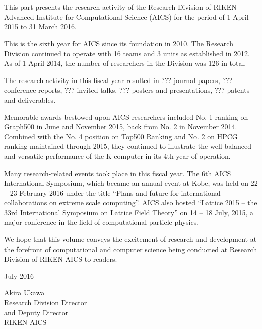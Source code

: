 \chapter*{}

This part presents the research activity of the Research Division of RIKEN Advanced Institute for Computational Science (AICS) for the period of 1 April 2015 to 31 March 2016.

This is the sixth year for AICS since its foundation in 2010.  The Research Division continued to operate with 16 teams and 3 units as established in 2012.  As of 1 April 2014, the number of researchers in the Division was 126 in total.

The research activity in this fiscal year resulted in ??? journal papers, ??? conference reports, ??? invited talks, ??? posters and presentations, ??? patents and deliverables.

Memorable awards bestowed upon AICS researchers included No. 1 ranking on Graph500 in June and November 2015, back from No. 2 in November 2014.  Combined with the No. 4 position on Top500 Ranking and No. 2 on HPCG ranking maintained through 2015, they continued to illustrate the well-balanced and versatile performance of the K computer in its 4th year of operation.

Many research-related events took place in this fiscal year.  The 6th AICS International Symposium, which became an annual event at Kobe, was held on 22 – 23 February 2016 under the title “Plans and future for international collaborations on extreme scale computing”.  AICS also hosted “Lattice 2015 – the 33rd International Symposium on Lattice Field Theory” on 14 – 18 July, 2015, a major conference in the field of computational particle physics.

We hope that this volume conveys the excitement of research and development at the forefront of computational and computer science being conducted at Research Division of RIKEN AICS to readers.

\vspace{1cm}

\noindent
July 2016

\begin{flushright}
Akira Ukawa\\
Research Division Director\\
and Deputy Director\\
RIKEN AICS
\end{flushright}
